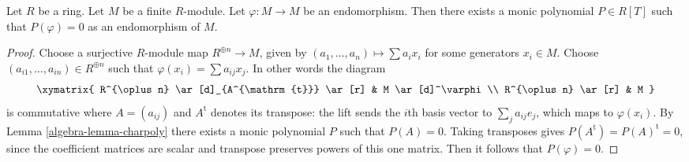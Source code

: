 \begin{lemma}
\label{editorial-source-lemma-charpoly-module}
Let $R$ be a ring.
Let $M$ be a finite $R$-module.
Let $\varphi : M \to M$ be an endomorphism.
Then there exists a monic polynomial $P \in R[T]$ such that
$P(\varphi) = 0$ as an endomorphism of $M$.
\end{lemma}

\begin{proof}
Choose a surjective $R$-module map $R^{\oplus n} \to M$, given by
$(a_1, \ldots, a_n) \mapsto \sum a_ix_i$ for some generators $x_i \in M$.
Choose $(a_{i1}, \ldots, a_{in}) \in R^{\oplus n}$ such that
$\varphi(x_i) = \sum a_{ij} x_j$. In other words the diagram
$$
\xymatrix{
R^{\oplus n} \ar[d]_{A^{\mathrm{t}}} \ar[r] & M \ar[d]^\varphi \\
R^{\oplus n} \ar[r] & M
}
$$
is commutative where $A = (a_{ij})$ and $A^{\mathrm{t}}$
denotes its transpose: the lift sends the $i$th basis vector to
$\sum_j a_{ij}e_j$, which maps to $\varphi(x_i)$.
By
Lemma \ref{algebra-lemma-charpoly}
there exists a monic polynomial $P$ such that $P(A) = 0$.
Taking transposes gives $P(A^{\mathrm{t}})=P(A)^{\mathrm{t}}=0$,
since the coefficient matrices are scalar and transpose preserves
powers of this one matrix.
Then it follows that $P(\varphi) = 0$.
\end{proof}